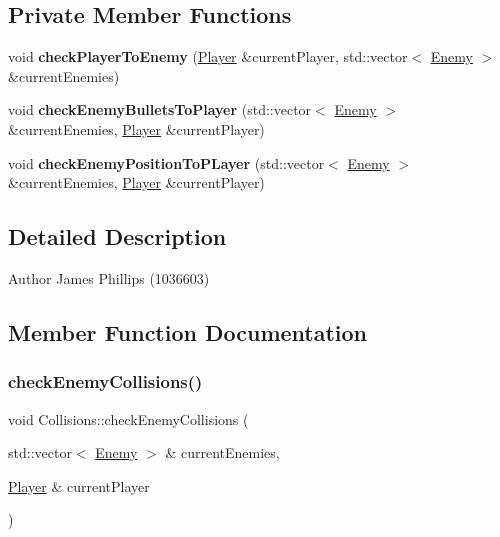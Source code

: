 \subsection*{Private Member Functions}
\begin{DoxyCompactItemize}
\item 
\mbox{\label{class_collisions_a5c4cd9f8f690d0ba92fe5aabfb8d88fa}} 
void {\bfseries check\+Player\+To\+Enemy} (\hyperlink{class_player}{Player} \&current\+Player, std\+::vector$<$ \hyperlink{class_enemy}{Enemy} $>$ \&current\+Enemies)
\item 
\mbox{\label{class_collisions_a421f805635d151a14481d5993fa3e9dc}} 
void {\bfseries check\+Enemy\+Bullets\+To\+Player} (std\+::vector$<$ \hyperlink{class_enemy}{Enemy} $>$ \&current\+Enemies, \hyperlink{class_player}{Player} \&current\+Player)
\item 
\mbox{\label{class_collisions_a7ea0eaf049794a750a9115ff47eb3c45}} 
void {\bfseries check\+Enemy\+Position\+To\+P\+Layer} (std\+::vector$<$ \hyperlink{class_enemy}{Enemy} $>$ \&current\+Enemies, \hyperlink{class_player}{Player} \&current\+Player)
\end{DoxyCompactItemize}


\subsection{Detailed Description}
\begin{DoxyAuthor}{Author}
James Phillips (1036603) 
\end{DoxyAuthor}


\subsection{Member Function Documentation}
\mbox{\label{class_collisions_aa628e8ae15bab7e085e4962be22ff16e}} 
\subsubsection{\texorpdfstring{check\+Enemy\+Collisions()}{checkEnemyCollisions()}}
{\footnotesize\ttfamily void Collisions\+::check\+Enemy\+Collisions (\begin{DoxyParamCaption}\item[{std\+::vector$<$ \hyperlink{class_enemy}{Enemy} $>$ \&}]{current\+Enemies,  }\item[{\hyperlink{class_player}{Player} \&}]{current\+Player }\end{DoxyParamCaption})}



